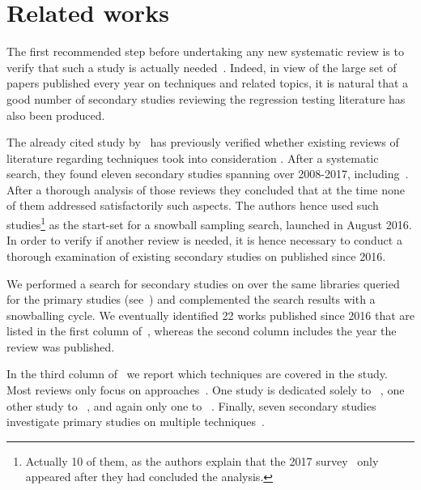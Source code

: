 \section{Related works}\label{sec:lit_related}

The first recommended step before undertaking any new systematic review is to verify that such a study is actually needed~\cite{kitchenham2004procedures}.
Indeed, in view of the large set of papers published every year on \rt techniques and related topics, it is natural that a good number of secondary studies reviewing the regression testing literature has also been produced.  

The already cited study by~\citet{bin_ali_search_2019} has previously verified whether existing reviews of literature regarding \rt techniques took into consideration \rea.
After a systematic search, they found eleven secondary studies spanning over 2008-2017, including~\cite{rosero_15_2016,felderer2015systematic,engstrom2010systematic,zarrad2015systematic,kazmi_effective_2017,harrold2008retesting,catal2012application,yoo2012regression,qiu2014regression,singh2012systematic,catal2013test}. After a thorough analysis of those reviews they concluded that at the time none of them addressed satisfactorily such aspects.
The authors hence used such studies\footnote{Actually 10 of them, as the authors explain that the 2017 survey~\cite{kazmi_effective_2017} only appeared after they had concluded the analysis.} as the start-set for a snowball sampling search, launched in August 2016.  
In order to verify if another review is needed, it is hence necessary to conduct a thorough examination of existing secondary studies on \rt published since 2016.

We performed a search for secondary studies on \rt over the same libraries queried for the primary studies (see~) and complemented the search results with a snowballing cycle.
We eventually identified 
22 works published since 2016 that are listed in the first column of~, whereas the
second column includes the year the review was published.




In the third column of~ we report which \rt techniques are covered in the study.
Most reviews only focus on \tcp approaches~\cite{hao_test-case_2016, mukherjee_survey_2018, lou_survey_2018, khatibsyarbini_test_2018, bajaj_systematic_2019, prado_lima_test_2020, hasnain_comprehensive_2020,abdul2021systematic,hasnain2021ontology,mohd2021model,samad2021regression,ahmed_value_2022}.
One study is dedicated solely to \tcs~\cite{kazmi_effective_2017}, one other study to \tsr~\cite{rehman_khan_systematic_2018}, and again only one to \tsa~\cite{danglot2019snowballing}.
Finally, seven secondary studies investigate primary studies on multiple \rt techniques~\cite{rosero_15_2016, do_recent_2016, bajaj_survey_2018, bin_ali_search_2019,sadri2022survey,rosero2021software,pan2022test}.

